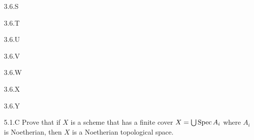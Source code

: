 \begin{exercise}{3.6.S}
\end{exercise}
\begin{solution}
    \todo{} 
\end{solution}

\begin{exercise}{3.6.T}

\end{exercise}
\begin{solution}
    \todo{}
\end{solution}

\begin{exercise}{3.6.U}

\end{exercise}
\begin{solution}
    \todo{}
\end{solution}

\begin{exercise}{3.6.V}
\end{exercise}
\begin{solution}
    \todo{}
\end{solution}

\begin{exercise}{3.6.W}
\end{exercise}
\begin{solution}
    \todo{}
\end{solution}

\begin{exercise}{3.6.X}

\end{exercise}
\begin{solution}
    \todo{}
\end{solution}

\begin{exercise}{3.6.Y}

\end{exercise}
\begin{solution}
    \todo{}
\end{solution}

\begin{exercise}{5.1.C}
    Prove that if $X$ is a scheme that has a finite cover $X = \bigcup \operatorname{Spec} A_i$ where $A_i$ is Noetherian, then $X$ is a Noetherian topological space.  
\end{exercise}
\begin{solution}
    \todo{}
\end{solution}

